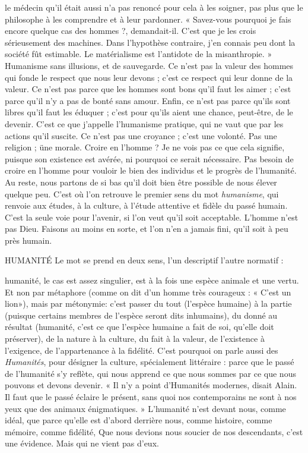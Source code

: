 le médecin qu’il était aussi n’a pas renoncé pour cela à les soigner, pas plus que
le philosophe à les comprendre et à leur pardonner. « Savez-vous pourquoi je
fais encore quelque cas des hommes ?, demandait-il. C’est que je les crois
sérieusement des machines. Dans l’hypothèse contraire, j’en connais peu dont
la société fût estimable. Le matérialisme est l’antidote de la misanthropie. »
Humanisme sans illusions, et de sauvegarde. Ce n’est pas la valeur des hommes
qui fonde le respect que nous leur devons ; c’est ce respect qui leur donne de la
valeur. Ce n’est pas parce que les hommes sont bons qu’il faut les aimer ; c'est
parce qu’il n’y a pas de bonté sans amour. Enfin, ce n’est pas parce qu’ils sont
libres qu’il faut les éduquer ; c’est pour qu’ils aient une chance, peut-être, de le
devenir. C’est ce que j'appelle l’humanisme pratique, qui ne vaut que par les
actions qu’il suscite. Ce n’est pas une croyance ; c’est une volonté. Pas une
religion ; üne morale. Croire en l’homme ? Je ne vois pas ce que cela signifie,
puisque son existence est avérée, ni pourquoi ce serait nécessaire. Pas besoin de
croire en l’homme pour vouloir le bien des individus et le progrès de l’humanité.
Au reste, nous partons de si bas qu’il doit bien être possible de nous élever
quelque peu. C’est où l’on retrouve le premier sens du mot {\it humanisme}, qui
renvoie aux études, à la culture, à l’étude attentive et fidèle du passé humain.
C’est la seule voie pour l'avenir, si l’on veut qu’il soit acceptable. L'homme
n’est pas Dieu. Faisons au moins en sorte, et l’on n’en a jamais fini, qu’il soit à
peu près humain.

HUMANITÉ Le mot se prend en deux sens, l’un descriptif l’autre normatif :

humanité, le cas est assez singulier, est à la fois une espèce
animale et une vertu. Et non par métaphore (comme on dit d’un homme très
courageux : « C’est un lion»), mais par métonymie: c’est passer du tout
(l'espèce humaine) à la partie (puisque certains membres de l’espèce seront dits
inhumains), du donné au résultat (humanité, c’est ce que l'espèce humaine a
fait de soi, qu’elle doit préserver), de la nature à la culture, du fait à la valeur,
de l’existence à l’exigence, de l’appartenance à la fidélité. C’est pourquoi on
parle aussi des {\it Humanités}, pour désigner la culture, spécialement littéraire :
parce que le passé de l'humanité s’y reflète, qui nous apprend ce que nous
sommes par ce que nous pouvons et devons devenir. « Il n’y a point d’Humanités
modernes, disait Alain. Il faut que le passé éclaire le présent, sans quoi nos
contemporains ne sont à nos yeux que des animaux énigmatiques. » L’humanité
n’est devant nous, comme idéal, que parce qu’elle est d’abord derrière
nous, comme histoire, comme mémoire, comme fidélité, Que nous devions
nous soucier de nos descendants, c’est une évidence. Mais qui ne vient pas
d’eux.

